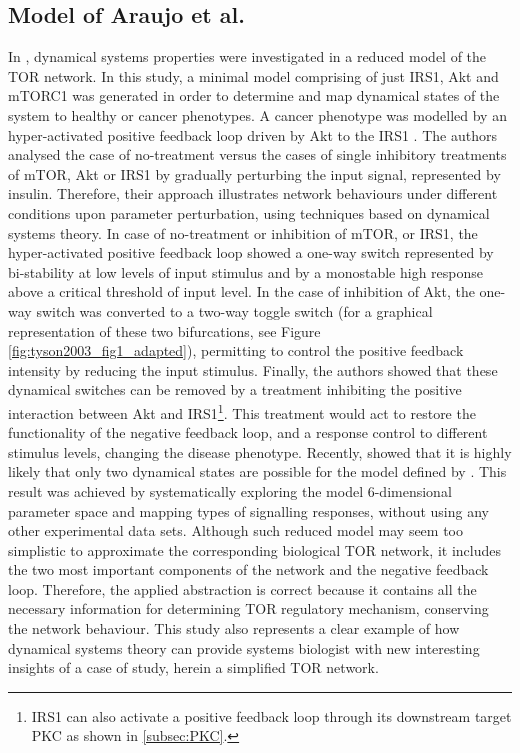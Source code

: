 \subsection{Model of Araujo et al.}
\label{subsec:Model of Araujo et al.}
In \citep{Araujo2007}, dynamical systems properties were investigated in a reduced model of the TOR network. In this study, a minimal model comprising of just IRS1, Akt and mTORC1 was generated in order to determine and map dynamical states of the system to healthy or cancer phenotypes. A cancer phenotype was modelled by an hyper-activated positive feedback loop driven by Akt to the IRS1 \citep{Gual2005}. The authors analysed the case of no-treatment versus the cases of single inhibitory treatments of mTOR, Akt or IRS1 by gradually perturbing the input signal, represented by insulin. Therefore, their approach illustrates network behaviours under different conditions upon parameter perturbation, using techniques based on dynamical systems theory. In case of no-treatment or inhibition of mTOR, or IRS1, the hyper-activated positive feedback loop showed a one-way switch represented by bi-stability at low levels of input stimulus and by a monostable high response above a critical threshold of input level. In the 
case of inhibition of Akt, the one-way switch was converted to a two-way toggle switch (for a graphical representation of these two bifurcations, see Figure \ref{fig:tyson2003_fig1_adapted}), permitting to control the positive feedback intensity by reducing the input stimulus. Finally, the authors showed that these dynamical switches can be removed by a treatment inhibiting the positive interaction between Akt and IRS1\footnote{IRS1 can also activate a positive feedback loop through its downstream target PKC as shown in \ref{subsec:PKC}.}. This treatment would act to restore the functionality of the negative feedback loop, and a response control to different stimulus levels, changing the disease phenotype. Recently, \citet{Wang2010bifurcation} showed that it is highly likely that only two dynamical states are possible for the model defined by \citep{Araujo2007}. This result was achieved by systematically exploring the model $6$-dimensional parameter space and mapping types of 
signalling responses, without using any other experimental data sets. Although such reduced model may seem too simplistic to approximate the corresponding biological TOR network, it includes the two most important components of the network and the negative feedback loop. Therefore, the applied abstraction is correct because it contains all the necessary information for determining TOR regulatory mechanism, conserving the network behaviour. This study also represents a clear example of how dynamical systems theory can provide systems biologist with new interesting insights of a case of study, herein a simplified TOR network.

